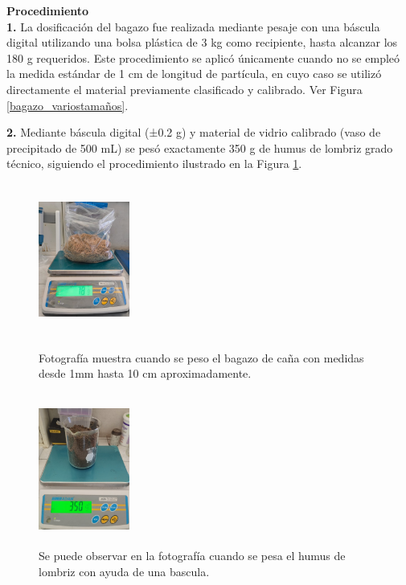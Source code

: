 \documentclass[12pt]{article}
\begin{document}
			
			\textbf{Procedimiento}
			\\[0.5em]
			\textbf{1.}	La dosificación del bagazo fue realizada mediante pesaje con una báscula digital utilizando una bolsa plástica de 3 kg como recipiente, hasta alcanzar los 180 g requeridos. Este procedimiento se aplicó únicamente cuando no se empleó la medida estándar de 1 cm de longitud de partícula, en cuyo caso se utilizó directamente el material previamente clasificado y calibrado. Ver Figura \ref{bagazo_variostamaños}.
		
			
			\textbf{2.}	Mediante báscula digital (±0.2 g) y material de vidrio calibrado (vaso de precipitado de 500 mL) se pesó exactamente 350 g de humus de lombriz grado técnico, siguiendo el procedimiento ilustrado en la Figura \ref{humus}.
			
			
				\begin{figure}[H]
				\centering
				\begin{minipage}{0.46\textwidth}
						\centering
					\includegraphics[width=3cm, height=5cm]{imagenes/pesado2}
					\caption{Fotografía muestra cuando se peso el bagazo de caña con medidas desde 1mm  hasta 10 cm aproximadamente.}
					\label{bagazo_variostamaños}
				\end{minipage}
				\hfill
				\begin{minipage}{0.48\textwidth}
				\centering
				\includegraphics[width=3cm, height=5cm]{imagenes/humus}
				\caption{Se puede observar en la fotografía cuando se pesa el humus de lombriz con ayuda de una bascula.}
				\label{humus}
				\end{minipage}
			\end{figure}
			
\end{document}
